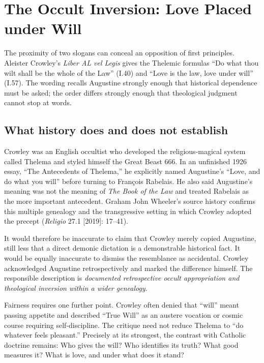 \section{The Occult Inversion: Love Placed under Will}

The proximity of two slogans can conceal an opposition of first principles. Aleister Crowley's \emph{Liber AL vel Legis} gives the Thelemic formulas ``Do what thou wilt shall be the whole of the Law'' (I.40) and ``Love is the law, love under will'' (I.57). The wording recalls Augustine strongly enough that historical dependence must be asked; the order differs strongly enough that theological judgment cannot stop at words.

\subsection{What history does and does not establish}

Crowley was an English occultist who developed the religious-magical system called Thelema and styled himself the Great Beast 666. In an unfinished 1926 essay, ``The Antecedents of Thelema,'' he explicitly named Augustine's ``Love, and do what you will'' before turning to François Rabelais. He also said Augustine's meaning was not the meaning of \emph{The Book of the Law} and treated Rabelais as the more important antecedent. Graham John Wheeler's source history confirms this multiple genealogy and the transgressive setting in which Crowley adopted the precept (\emph{Religio} 27.1 [2019]: 17--41).

It would therefore be inaccurate to claim that Crowley merely copied Augustine, still less that a direct demonic dictation is a demonstrable historical fact. It would be equally inaccurate to dismiss the resemblance as accidental. Crowley acknowledged Augustine retrospectively and marked the difference himself. The responsible description is \emph{documented retrospective occult appropriation and theological inversion within a wider genealogy}.

Fairness requires one further point. Crowley often denied that ``will'' meant passing appetite and described ``True Will'' as an austere vocation or cosmic course requiring self-discipline. The critique need not reduce Thelema to ``do whatever feels pleasant.'' Precisely at its strongest, the contrast with Catholic doctrine remains: Who gives the will? Who identifies its truth? What good measures it? What is love, and under what does it stand?

